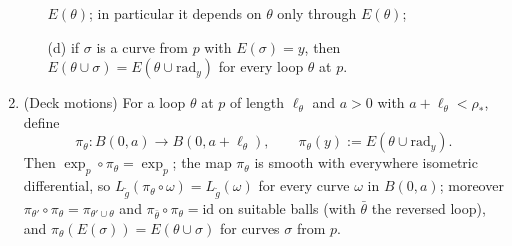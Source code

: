 \begin{lemma}
\begin{enumerate}
\begin{enumerate}
$E(\theta)$; in particular it depends on $\theta$ only through
$E(\theta)$;
\item[(d)] if $\sigma$ is a curve from $p$ with
$E(\sigma)=y$, then $E(\theta\cup\sigma)
=E(\theta\cup\mathrm{rad}_y)$ for every loop $\theta$ at $p$.
\end{enumerate}
\item (Deck motions) For a loop $\theta$ at $p$ of length
$\ell_\theta$ and $a>0$ with $a+\ell_\theta<\rho_*$, define
$$\pi_\theta\colon B(0,a)\to B(0,a+\ell_\theta),\qquad
\pi_\theta(y):=E(\theta\cup\mathrm{rad}_y).$$
Then $\exp_p\circ\pi_\theta=\exp_p$; the map
$\pi_\theta$ is smooth with everywhere isometric differential, so
$L_{\tilde g}(\pi_\theta\circ\omega)=L_{\tilde g}(\omega)$ for
every curve $\omega$ in $B(0,a)$; moreover
$\pi_{\theta'}\circ\pi_\theta=\pi_{\theta'\cup\theta}$ and
$\pi_{\bar\theta}\circ\pi_\theta=\mathrm{id}$ on suitable balls
(with $\bar\theta$ the reversed loop), and
$\pi_\theta(E(\sigma))=E(\theta\cup\sigma)$ for curves $\sigma$
from $p$.
\end{enumerate}
\end{lemma}

